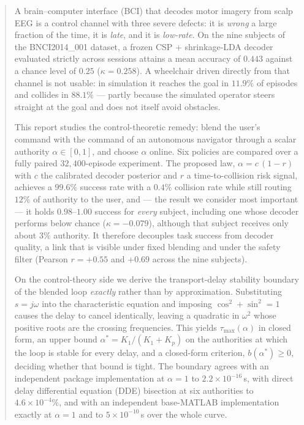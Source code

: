\documentclass[11pt,a4paper]{article}
\newcommand{\astar}{\alpha^{*}}
\theoremstyle{plain}
\theoremstyle{definition}
\begin{document}
\begin{abstract}
\noindent
A brain--computer interface (BCI) that decodes motor imagery from
scalp EEG is a control channel with three severe defects: it is
\emph{wrong} a large fraction of the time, it is \emph{late}, and it is
\emph{low-rate}. On the nine subjects of the BNCI2014\_001 dataset, a
frozen CSP + shrinkage-LDA decoder evaluated strictly across sessions
attains a mean accuracy of $0.443$ against a chance level of $0.25$
($\kappa = 0.258$). A wheelchair driven directly from that channel is
not usable: in simulation it reaches the goal in $11.9\%$ of episodes
and collides in $88.1\%$ --- partly because the simulated operator
steers straight at the goal and does not itself avoid obstacles.

This report studies the control-theoretic remedy: blend the user's
command with the command of an autonomous navigator through a scalar
authority $\alpha \in [0,1]$, and choose $\alpha$ online. Six policies
are compared over a fully paired $32{,}400$-episode experiment. The
proposed law, $\alpha = c\,(1-r)$ with $c$ the calibrated decoder
posterior and $r$ a time-to-collision risk signal, achieves a $99.6\%$
success rate with a $0.4\%$ collision rate while still routing $12\%$ of
authority to the user, and --- the result we consider most important ---
it holds $0.98$--$1.00$ success for \emph{every} subject, including one
whose decoder performs below chance ($\kappa = -0.079$), although that
subject receives only about $3\%$ authority. It therefore
decouples task success from decoder quality, a link that is visible
under fixed blending and under the safety filter (Pearson $r = +0.55$
and $+0.69$ across the nine subjects).

On the control-theory side we derive the transport-delay stability
boundary of the blended loop \emph{exactly} rather than by
approximation. Substituting $s = j\omega$ into the characteristic
equation and imposing $\cos^2 + \sin^2 = 1$ causes the delay to cancel
identically, leaving a quadratic in $\omega^2$ whose positive roots are
the crossing frequencies. This yields $\tau_{\max}(\alpha)$ in closed
form, an upper bound $\astar = K_1/(K_1+K_p)$ on the authorities at which
the loop is stable for every delay, and a closed-form criterion,
$b(\astar) \ge 0$, deciding whether that bound is tight. The boundary agrees with an independent
package implementation at $\alpha = 1$ to $2.2\times 10^{-16}$\,s, with
direct delay differential equation (DDE) bisection at six authorities to
$4.6\times10^{-4}\%$, and with
an independent base-MATLAB implementation exactly at $\alpha = 1$ and to
$5\times10^{-10}$\,s over the whole curve.


\end{abstract}
\end{document}
